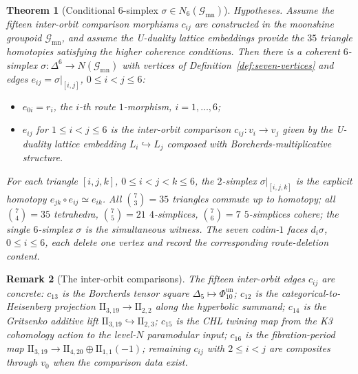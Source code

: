 \documentclass[11pt]{article}
\newtheorem{theorem}{Theorem}[section]
\newtheorem{remark}[theorem]{Remark}
\begin{document}
\begin{theorem}[Conditional $6$-simplex
\texorpdfstring{$\sigma \in N_6(\mathcal G_{\mathrm{mn}})$}{sigma in N6}]
\label{thm:six-simplex}
\noindent\emph{Hypotheses.} Assume the fifteen inter-orbit comparison
morphisms $c_{ij}$ are constructed in the moonshine groupoid
$\mathcal G_{\mathrm{mn}}$, and assume the U-duality lattice embeddings
provide the $35$ triangle homotopies satisfying the higher coherence
conditions.
Then there is a coherent $6$-simplex
$\sigma \colon \Delta^6 \to N(\mathcal G_{\mathrm{mn}})$ with
vertices of Definition~\ref{def:seven-vertices} and edges
$e_{ij} = \sigma|_{[i, j]}$, $0 \leq i < j \leq 6$:
\begin{itemize}
\item $e_{0i} = r_i$, the $i$-th route $1$-morphism,
$i = 1, \ldots, 6$;
\item $e_{ij}$ for $1 \leq i < j \leq 6$ is the inter-orbit
comparison $c_{ij} \colon v_i \to v_j$ given by the U-duality
lattice embedding $L_i \hookrightarrow L_j$ composed with
Borcherds-multiplicative structure.
\end{itemize}
For each triangle $[i, j, k]$, $0 \leq i < j < k \leq 6$, the
$2$-simplex $\sigma|_{[i,j,k]}$ is the explicit homotopy
$e_{jk} \circ e_{ij} \simeq e_{ik}$. All $\binom{7}{3} = 35$
triangles commute up to homotopy; all $\binom{7}{4} = 35$
tetrahedra, $\binom{7}{5} = 21$ $4$-simplices,
$\binom{7}{6} = 7$ $5$-simplices cohere; the single $6$-simplex
$\sigma$ is the simultaneous witness. The seven codim-$1$ faces
$d_i \sigma$, $0 \leq i \leq 6$, each delete one vertex and
record the corresponding route-deletion content.
\end{theorem}

\begin{remark}[The inter-orbit comparisons]
\label{rem:intercomparisons}
The fifteen inter-orbit edges $c_{ij}$ are concrete:
$c_{13}$ is the Borcherds tensor square
$\Delta_5 \mapsto \Phi_{10}^{\mathrm{un}}$; $c_{12}$ is the categorical-to-Heisenberg
projection $\mathrm{II}_{3,19} \to \mathrm{II}_{2,2}$ along the
hyperbolic summand; $c_{14}$ is the Gritsenko additive lift
$\mathrm{II}_{3,19} \hookrightarrow \mathrm{II}_{2,3}$;
$c_{15}$ is the CHL twining map from the K3 cohomology action to
the level-$N$ paramodular input; $c_{16}$ is the fibration-period map
$\mathrm{II}_{3,19} \to \mathrm{II}_{4,20} \oplus
\mathrm{II}_{1,1}(-1)$; remaining $c_{ij}$ with $2 \leq i < j$
are composites through $v_0$ when the comparison data exist.
\end{remark}
\end{document}
